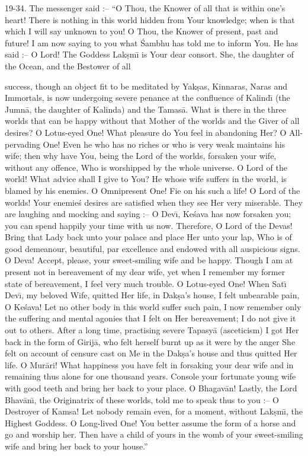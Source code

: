 19-34. The messenger said :-- ``O Thou, the Knower of all that is within one's heart! There is nothing in this world hidden from Your knowledge; when is that which I will say unknown to you! O Thou, the Knower of present, past and future! I am now saying to you what \'Sambhu has told me to inform You. He has said :-- O Lord! The Goddess Lak\d{s}m\={\i} is Your dear consort. She, the daughter of the Ocean, and the Bestower of all

success, though an object fit to be meditated by Yak\d{s}as, Kinnaras, Naras and Immortals, is now undergoing severe penance at the confluence of Kalind\={\i} (the Jumn\=a, the daughter of Kalinda) and the Tamas\=a. What is there in the three worlds that can be happy without that Mother of the worlds and the Giver of all desires? O Lotus-eyed One! What pleasure do You feel in abandoning Her? O All-pervading One! Even he who has no riches or who is very weak maintains his wife; then why have You, being the Lord of the worlds, forsaken your wife, without any offence, Who is worshipped by the whole universe. O Lord of the world! What advice shall I give to You? He whose wife suffers in the world, is blamed by his enemies. O Omnipresent One! Fie on his such a life! O Lord of the worlds! Your enemie\'s desires are satisfied when they see Her very miserable. They are laughing and mocking and saying :-- O Dev\={\i}, Ke\'sava has now forsaken you; you can spend happily your time with us now. Therefore, O Lord of the Devas! Bring that Lady back unto your palace and place Her unto your lap, Who is of good demeanour, beautiful, par excellence and endowed with all auspicious signs. O Deva! Accept, please, your sweet-smiling wife and be happy. Though I am at present not in bereavement of my dear wife, yet when I remember my former state of bereavement, I feel very much trouble. O Lotus-eyed One! When Sat\={\i} Dev\={\i}, my beloved Wife, quitted Her life, in Dak\d{s}a's house, I felt unbearable pain, O Ke\'sava! Let no other body in this world suffer such pain, I now remember only the suffering and mental agonies that I felt on Her bereavement; I do not give it out to others. After a long time, practising severe Tapasy\=a (asceticism) I got Her back in the form of Girij\=a, who felt herself burnt up as it were by the anger She felt on account of censure cast on Me in the Dak\d{s}a's house and thus quitted Her life. O Mur\=ari! What happiness you have felt in forsaking your dear wife and in remaining thus alone for one thousand years. Console your fortunate young wife with good teeth and bring her back to your place. O Bhagav\=an! Lastly, the Lord Bhav\=an\={\i}, the Originatrix of these worlds, told me to speak thus to you :-- O Destroyer of Kamsa! Let nobody remain even, for a moment, without Lak\d{s}m\={\i}, the Highest Goddess. O Long-lived One! You better assume the form of a horse and go and worship her. Then have a child of yours in the womb of your sweet-smiling wife and bring her back to your house.''

